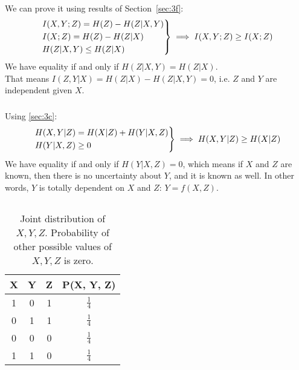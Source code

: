 \documentclass{article}
\begin{document}
\subsection{}
\subsubsection{}
We can prove it using results of Section~\ref{sec:3f}:
\begin{align*}
\begin{drcases}
I(X, Y; Z) = H(Z) - H(Z|X, Y)\\
I(X; Z) = H(Z) - H(Z|X)\\
H(Z|X, Y) \le H(Z|X)
\end{drcases}
\implies I(X, Y; Z) \ge I(X; Z)
\end{align*}
We have equality if and only if \(H(Z|X, Y) = H(Z|X)\).\\   
That means \(I(Z, Y|X) = H(Z|X) - H(Z|X, Y) = 0\), i.e. \(Z\) and \(Y\) are independent given \(X\).
\subsubsection{}
Using \ref{sec:3c}:
\begin{align*}
\begin{drcases}
H(X, Y|Z) = H(X|Z) + H(Y|X, Z)\\
H(Y|X, Z) \ge 0
\end{drcases}
\implies H(X, Y|Z) \ge H(X|Z)
\end{align*}
We have equality if and only if \(H(Y|X, Z) = 0\), which means if \(X\) and \(Z\) are known, then there is no uncertainty about \(Y\), and it is known as well.
In other words, \(Y\) is totally dependent on \(X\) and \(Z\): \(Y = f(X, Z)\).

\subsection{}
\subsubsection{}
\begin{table}[H]
\centering
\begin{tabular}{c|c|c|c}
X & Y & Z & P(X, Y, Z)\\
\hline
1 & 0 & 1 & \(\frac{1}{4}\)\\
0 & 1 & 1 & \(\frac{1}{4}\)\\
0 & 0 & 0 & \(\frac{1}{4}\)\\
1 & 1 & 0 & \(\frac{1}{4}\)    
\end{tabular}
\caption{Joint distribution of \(X, Y, Z\). Probability of other possible values of \(X, Y, Z\) is zero.}
\end{table}
\end{document}
